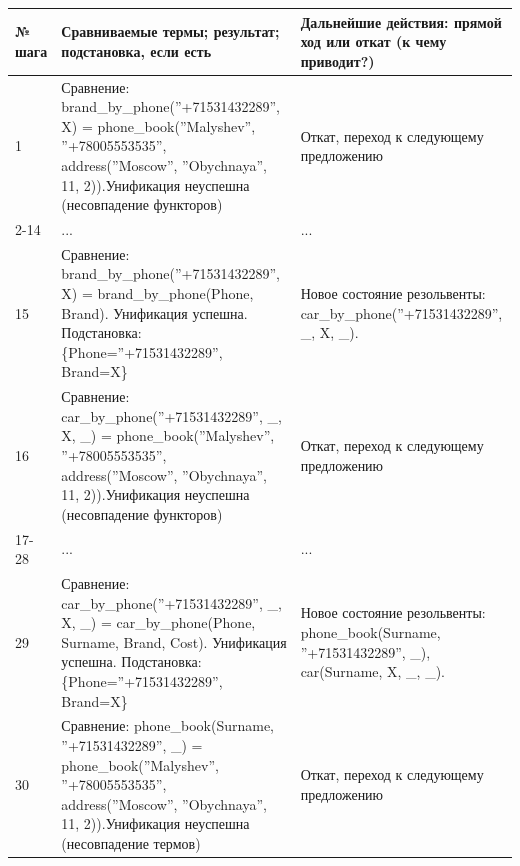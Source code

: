 \documentclass[12pt]{report}
\begin{document}
\begin{table}[H]
	\begin{center}
		\begin{tabular}{|p{1 cm}|p{11 cm}|p{7 cm}|}
			\hline
			№ шага & Сравниваемые термы; результат; подстановка, если есть & Дальнейшие действия: прямой ход или откат (к чему приводит?) \\
			\hline 
			1 & Сравнение: \newline brand\_by\_phone(''+71531432289'', X) = \newline phone\_book(''Malyshev'', ''+78005553535'', address(''Moscow'', ''Obychnaya'', 11, 2)).\newline Унификация неуспешна (несовпадение функторов) & Откат, переход к следующему предложению \\
			\hline
			2-14 & ... & ... \\
			\hline
			15 & Сравнение: \newline brand\_by\_phone(''+71531432289'', X) = \newline brand\_by\_phone(Phone, Brand). \newline Унификация успешна. \newline Подстановка: \{Phone=''+71531432289'', Brand=X\} & Новое состояние резольвенты: \newline car\_by\_phone(''+71531432289'', \_, X, \_). \\
			\hline
			16 & Сравнение: \newline car\_by\_phone(''+71531432289'', \_, X, \_) = \newline phone\_book(''Malyshev'', ''+78005553535'', address(''Moscow'', ''Obychnaya'', 11, 2)).\newline Унификация неуспешна (несовпадение функторов) & Откат, переход к следующему предложению \\
			\hline
			17-28 & ... & ... \\
			\hline
			29 & Сравнение: \newline car\_by\_phone(''+71531432289'', \_, X, \_) = \newline car\_by\_phone(Phone, Surname, Brand, Cost). \newline Унификация успешна. \newline Подстановка: \{Phone=''+71531432289'', Brand=X\} & Новое состояние резольвенты: \newline phone\_book(Surname, ''+71531432289'', \_), car(Surname, X, \_, \_). \\
			\hline
			30 & Сравнение: \newline phone\_book(Surname, ''+71531432289'', \_) = \newline phone\_book(''Malyshev'', ''+78005553535'', address(''Moscow'', ''Obychnaya'', 11, 2)).\newline Унификация неуспешна (несовпадение термов) & Откат, переход к следующему предложению \\

\end{tabular}
\end{center}
\end{table}
\end{document}

